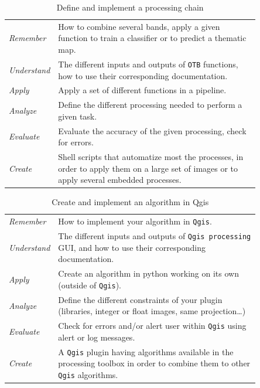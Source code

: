 \documentclass[a4paper,11pt,DIV=18]{scrartcl}
\begin{document}
\begin{table}[htbp]
\caption{\label{tab:org3770eee}
Define and implement a processing chain}
\centering
\begin{tabular}{lp{0.85\linewidth}}
\toprule
\emph{Remember} & How to  combine several bands, apply a given  function to train  a classifier or to predict a thematic map.\\
\emph{Understand} & The different  inputs and outputs of  \texttt{OTB} functions, how  to use their corresponding documentation.\\
\emph{Apply} & Apply a set of different functions in a pipeline.\\
\emph{Analyze} & Define the different processing needed to perform a given task.\\
\emph{Evaluate} & Evaluate the accuracy of the given processing, check for errors.\\
\emph{Create} & Shell scripts that automatize most the processes, in order to  apply them  on a large set of images  or to apply  several embedded  processes.\\
\bottomrule
\end{tabular}
\end{table}

\begin{table}[htbp]
\caption{\label{tab:org72d3e53}
Create and implement an algorithm in Qgis}
\centering
\begin{tabular}{lp{0.85\linewidth}}
\toprule
\emph{Remember} & How to implement your algorithm in \texttt{Qgis}.\\
\emph{Understand} & The different inputs and outputs of  \texttt{Qgis processing} GUI, and how to use their corresponding documentation.\\
\emph{Apply} & Create an algorithm in python working on its own (outside of \texttt{Qgis}).\\
\emph{Analyze} & Define the different constraints of your plugin (libraries, integer or float images, same projection\ldots{})\\
\emph{Evaluate} & Check for errors and/or alert user within \texttt{Qgis} using alert or log messages.\\
\emph{Create} & A \texttt{Qgis} plugin having algorithms available in the processing toolbox in order to combine them to other \texttt{Qgis} algorithms.\\
\bottomrule
\end{tabular}
\end{table}
\end{document}
